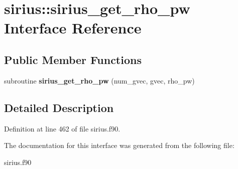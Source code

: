 \hypertarget{interfacesirius_1_1sirius__get__rho__pw}{}\section{sirius\+:\+:sirius\+\_\+get\+\_\+rho\+\_\+pw Interface Reference}
\label{interfacesirius_1_1sirius__get__rho__pw}
\subsection*{Public Member Functions}
\begin{DoxyCompactItemize}
\item 
\hypertarget{interfacesirius_1_1sirius__get__rho__pw_ab3d31f74da0a8271c1dbd6a48322f4c3}{}subroutine {\bfseries sirius\+\_\+get\+\_\+rho\+\_\+pw} (num\+\_\+gvec, gvec, rho\+\_\+pw)\label{interfacesirius_1_1sirius__get__rho__pw_ab3d31f74da0a8271c1dbd6a48322f4c3}

\end{DoxyCompactItemize}


\subsection{Detailed Description}


Definition at line 462 of file sirius.\+f90.



The documentation for this interface was generated from the following file\+:\begin{DoxyCompactItemize}
\item 
sirius.\+f90\end{DoxyCompactItemize}
